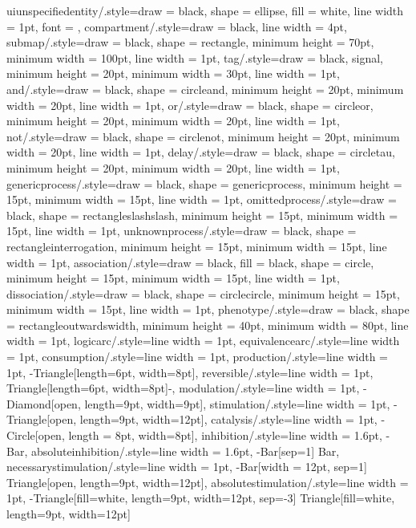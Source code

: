 {    uiunspecifiedentity/.style={draw = black, shape = ellipse, fill = white, line width = 1pt, font = {\tiny\sffamily}},
    compartment/.style={draw = black, line width = 4pt},
    submap/.style={draw = black, shape = rectangle, minimum height = 70pt, minimum width = 100pt, line width = 1pt},
    tag/.style={draw = black, signal, minimum height = 20pt, minimum width = 30pt, line width = 1pt},
    and/.style={draw = black, shape = circleand, minimum height = 20pt, minimum width = 20pt, line width = 1pt},
    or/.style={draw = black, shape = circleor, minimum height = 20pt, minimum width = 20pt, line width = 1pt},
    not/.style={draw = black, shape = circlenot, minimum height = 20pt, minimum width = 20pt, line width = 1pt},
    delay/.style={draw = black, shape = circletau, minimum height = 20pt, minimum width = 20pt, line width = 1pt},
    genericprocess/.style={draw = black, shape = genericprocess, minimum height = 15pt, minimum width = 15pt, line width = 1pt},
    omittedprocess/.style={draw = black, shape = rectangleslashslash, minimum height = 15pt, minimum width = 15pt, line width = 1pt},
    unknownprocess/.style={draw = black, shape = rectangleinterrogation, minimum height = 15pt, minimum width = 15pt, line width = 1pt},
    association/.style={draw = black, fill = black, shape = circle, minimum height = 15pt, minimum width = 15pt, line width = 1pt},
    dissociation/.style={draw = black, shape = circlecircle, minimum height = 15pt, minimum width = 15pt, line width = 1pt},
    phenotype/.style={draw = black, shape = rectangleoutwardswidth, minimum height = 40pt, minimum width = 80pt, line width = 1pt},
    logicarc/.style={line width = 1pt},
    equivalencearc/.style={line width = 1pt},
    consumption/.style={line width = 1pt},
    production/.style={line width = 1pt, -{Triangle[length=6pt, width=8pt]}},
    reversible/.style={line width = 1pt, {Triangle[length=6pt, width=8pt]}-},
    modulation/.style={line width = 1pt, -{Diamond[open, length=9pt, width=9pt]}},
    stimulation/.style={line width = 1pt, -{Triangle[open, length=9pt, width=12pt]}},
    catalysis/.style={line width = 1pt, -{Circle[open, length = 8pt, width=8pt]}},
    inhibition/.style={line width = 1.6pt, -{Bar}},
    absoluteinhibition/.style={line width = 1.6pt, -{Bar[sep=1] Bar}},
    necessarystimulation/.style={line width = 1pt, -{Bar[width = 12pt, sep=1] Triangle[open, length=9pt, width=12pt]}},
    absolutestimulation/.style={line width = 1pt, -{Triangle[fill=white, length=9pt, width=12pt, sep=-3] Triangle[fill=white, length=9pt, width=12pt]}}}

